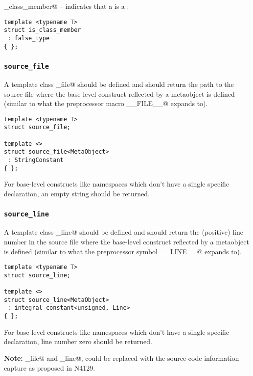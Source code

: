 \verb@is_class_member@ -- indicates that a  is a :
\begin{verbatim}
template <typename T>
struct is_class_member
 : false_type
{ };
\end{verbatim}

\subsubsection{\texttt{source\_file}}

A template class \verb@source_file@ should be defined and should return the
path to the source file where the base-level construct reflected by a
metaobject is defined (similar to what the preprocessor macro \verb@__FILE__@
expands to).

\begin{verbatim}
template <typename T>
struct source_file;

template <>
struct source_file<MetaObject>
 : StringConstant
{ };
\end{verbatim}

For base-level constructs like namespaces which don't have a single specific
declaration, an empty string should be returned.

\subsubsection{\texttt{source\_line}}

A template class \verb@source_line@ should be defined and should return the (positive)
line number in the source file where the base-level construct reflected by a
metaobject is defined (similar to what the preprocessor symbol \verb@__LINE__@
expands to).

\begin{verbatim}
template <typename T>
struct source_line;

template <>
struct source_line<MetaObject>
 : integral_constant<unsigned, Line>
{ };
\end{verbatim}

For base-level constructs like namespaces which don't have a single specific
declaration, line number zero should be returned.

\textbf{Note:} \verb@source_file@ and \verb@source_line@, could be
replaced with the source-code information capture as proposed in N4129.

